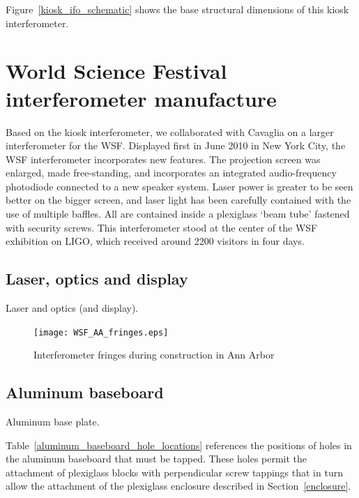 Figure~\ref{kiosk_ifo_schematic} shows the base structural dimensions of this kiosk interferometer.


    \section{World Science Festival interferometer manufacture}
    \label{manufacture}

    
Based on the kiosk interferometer, we collaborated with Cavaglia on a larger interferometer for the WSF.
Displayed first in June 2010 in New York City, the WSF interferometer incorporates new features.
The projection screen was enlarged, made free-standing,
and incorporates an integrated audio-frequency photodiode connected to a new speaker system.
Laser power is greater to be seen better on the bigger screen, and
laser light has been carefully contained with the use of multiple baffles.
All are contained inside a plexiglass `beam tube' fastened with security screws.
This interferometer stood at the center of the WSF exhibition on LIGO, which received around 2200 visitors in four days.


        \subsection{Laser, optics and display}
        \label{laser_display}

            Laser and optics (and display).

	\begin{figure}
	\begin{center}
	\texttt{[image: WSF\_AA\_fringes.eps]}
	\caption{Interferometer fringes during construction in Ann Arbor}
	\label{WSF_AA_fringes}
	\end{center}
	\end{figure}


        \subsection{Aluminum baseboard}
        \label{baseplate}

            Aluminum base plate.

Table~\ref{aluminum_baseboard_hole_locations} references the positions of holes in the aluminum baseboard that must be tapped. These holes permit the attachment of plexiglass blocks with perpendicular screw tappings that in turn allow the attachment of the plexiglass enclosure described in Section~\ref{enclosure}.

